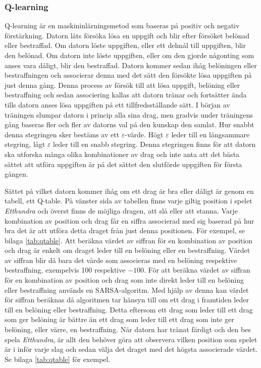 \documentclass[12pt,a4paper]{article}
\begin{document}
      \subsubsection{Q-learning}\label{subsubsec:qlearning}
        Q-learning är en maskininlärningsmetod som baseras på positiv och negativ förstärkning. Datorn låts försöka lösa en uppgift och blir efter försöket belönad eller bestraffad. Om datorn löste uppgiften, eller ett delmål till uppgiften, blir den belönad. Om datorn inte löste uppgiften, eller om den gjorde någonting som anses vara dåligt, blir den bestraffad. Datorn kommer sedan ihåg belöningen eller bestraffningen och associerar denna med det sätt den försökte lösa uppgiften på just denna gång. Denna process av försök till att lösa uppgift, belöning eller bestraffning och sedan associering kallas att datorn tränar och fortsätter ända tills datorn anses lösa uppgiften på ett tillfredsställande sätt. I början av träningen slumpar datorn i princip alla sina drag, men gradvis under träningens gång baseras fler och fler av datorns val på den kunskap den samlat. Hur snabbt denna stegringen sker bestäms av ett $\varepsilon$-värde. Högt $\varepsilon$ leder till en långsammare stegring, lågt $\varepsilon$ leder till en snabb stegring. Denna stegringen finns för att datorn ska utforska många olika kombinationer av drag och inte anta att det bästa sättet att utföra uppgiften är på det sättet den slutförde uppgiften för första gången. 
        
        Sättet på vilket datorn kommer ihåg om ett drag är bra eller dåligt är genom en tabell, ett Q-table. På vänster sida av tabellen finns varje giltig position i spelet \emph{Etthundra} och överst finns de möjliga dragen, att slå eller att stanna. Varje kombination av position och drag får en siffra associerad med sig baserad på hur bra det är att utföra detta draget från just denna positionen. För exempel, se bilaga \ref{tab:qtable}. Att beräkna värdet av siffran för en kombination av position och drag är enkelt om draget leder till en belöning eller en bestraffning. Värdet av siffran blir då bara det värde som associeras med en belöning respektive bestraffning, exempelvis 100 respektive $-100$. För att beräkna värdet av siffran för en kombination av position och drag som inte direkt leder till en belöning eller bestraffning används en SARSA-algoritm. Med hjälp av denna kan värdet för siffran beräknas då algoritmen tar hänsyn till om ett drag i framtiden leder till en belöning eller bestraffning. Detta eftersom ett drag som leder till ett drag som ger belöning är bättre än ett drag som leder till ett drag som inte ger belöning, eller värre, en bestraffning. När datorn har tränat färdigt och den bes spela \emph{Etthundra}, är allt den behöver göra att observera vilken position som spelet är i inför varje slag och sedan välja det draget med det högsta associerade värdet. Se bilaga \ref{tab:qtable} för exempel.
\end{document}
